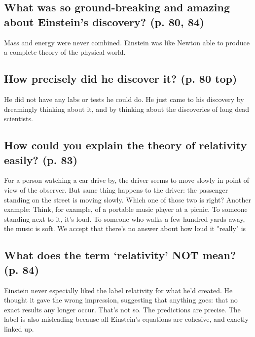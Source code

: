 \subsection*{What was so ground-breaking and amazing about Einstein’s discovery? (p. 80, 84)}
Mass and energy were never combined. Einstein was like Newton able to produce a complete theory of the physical world.

\subsection*{How precisely did he discover it? (p. 80 top)}
He did not have any labs or tests he could do. He just came to his discovery by dreamingly thinking about it, and by thinking about the discoveries of long dead scientists.

\subsection*{How could you explain the theory of relativity easily? (p. 83)}
For a person watching a car drive by, the driver seems to move slowly in point of view of the observer. But same thing happens to the driver: the passenger standing on the street is moving slowly. Which one of those two is right? Another example: Think, for example, of a portable music player at a picnic. To someone standing next to it, it's loud. To someone who walks a few hundred yards away, the music is soft. We accept that there's no answer about how loud it "really" is

\subsection*{What does the term ‘relativity’ NOT mean? (p. 84)}
Einstein never especially liked the label relativity for what he'd created. He thought it gave the wrong impression, suggesting that anything goes: that no exact results any longer occur. That's not so. The predictions are precise. The label is also misleading because all Einstein's equations are cohesive, and exactly linked up.

